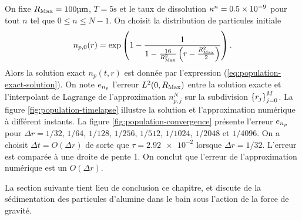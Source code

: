 On fixe $R_\mathrm{Max} = \num{100}\si{\micro\meter}$, $T = 5\si{\second}$ et
le taux de dissolution
$\kappa^n = \num{0.5e-9}$ pour tout $n$ tel que $0\leq n\leq
N-1$. On choisit la distribution de particules initiale
\begin{equation}\label{eq:population-test-ic}
  n_{p,0}(r) = \exp\left( 1 - \frac{1}{1 - \frac{16}{R_\mathrm{Max}^2}\left( r - \frac{R_\mathrm{Max}^2}{2} \right)} \right).
\end{equation}
Alors la solution exact $n_p(t, r)$ est donnée par l'expression
(\ref{eq:population-exact-solution}). On note $e_{n_p}$ l'erreur
$L^2(0,R_\mathrm{Max})$ entre la solution exacte et l'interpolant de Lagrange
de l'approximation $n_{p,j}^N$ sur la subdivision
$\left\{ r_j \right\}_{j=0}^M$. La figure \ref{fig:population-timelapse}
illustre la solution et l'approximation numérique à différent
instants. La figure \ref{fig:population-convergence} présente
l'erreur $e_{n_p}$ pour $\Delta r = 1/32$, $1/64$, $1/128$, $1/256$, $1/512$,
$1/1024$, $1/2048$ et $1/4096$. On a choisit $\Delta t = O(\Delta r)$ de sorte que
$\tau = \num{2.92e-2}$ lorsque $\Delta r = 1/32$.
L'erreur est comparée à une droite de pente 1. On conclut que l'erreur
de l'approximation numérique est un $O(\Delta r)$.

La section suivante tient lieu de conclusion ce chapitre, et discute
de la sédimentation des particules d'alumine dans le bain sous
l'action de la force de gravité.
